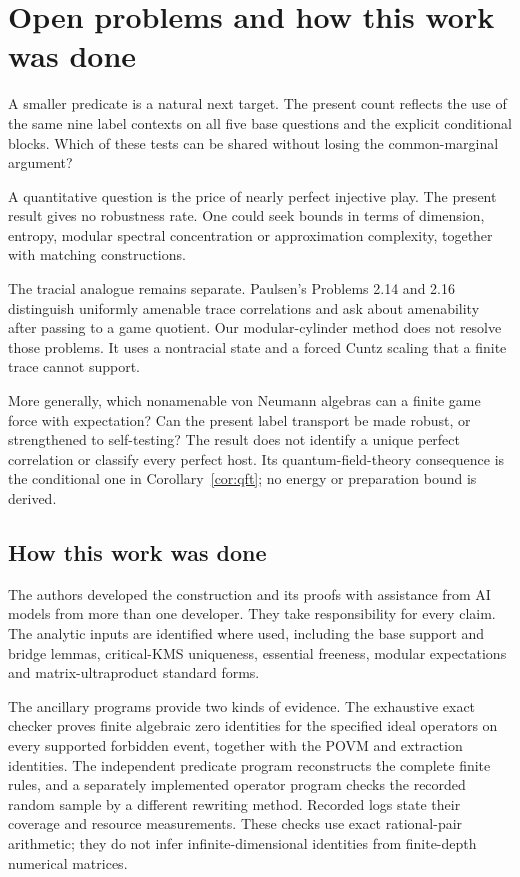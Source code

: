 \section{Open problems and how this work was done}\label{sec:discussion}
A smaller predicate is a natural next target. The present count reflects the use of the same nine label contexts on all five base questions and the explicit conditional blocks. Which of these tests can be shared without losing the common-marginal argument?

A quantitative question is the price of nearly perfect injective play. The present result gives no robustness rate. One could seek bounds in terms of dimension, entropy, modular spectral concentration or approximation complexity, together with matching constructions.

The tracial analogue remains separate. Paulsen's Problems 2.14 and 2.16 \cite{Paulsen} distinguish uniformly amenable trace correlations and ask about amenability after passing to a game quotient. Our modular-cylinder method does not resolve those problems. It uses a nontracial state and a forced Cuntz scaling that a finite trace cannot support.

More generally, which nonamenable von Neumann algebras can a finite game force with expectation? Can the present label transport be made robust, or strengthened to self-testing? The result does not identify a unique perfect correlation or classify every perfect host. Its quantum-field-theory consequence is the conditional one in Corollary~\ref{cor:qft}; no energy or preparation bound is derived.

\subsection*{How this work was done}
The authors developed the construction and its proofs with assistance from AI models from more than one developer. They take responsibility for every claim. The analytic inputs are identified where used, including the base support and bridge lemmas, critical-KMS uniqueness, essential freeness, modular expectations and matrix-ultraproduct standard forms.

The ancillary programs provide two kinds of evidence. The exhaustive exact checker proves finite algebraic zero identities for the specified ideal operators on every supported forbidden event, together with the POVM and extraction identities. The independent predicate program reconstructs the complete finite rules, and a separately implemented operator program checks the recorded random sample by a different rewriting method. Recorded logs state their coverage and resource measurements. These checks use exact rational-pair arithmetic; they do not infer infinite-dimensional identities from finite-depth numerical matrices.

